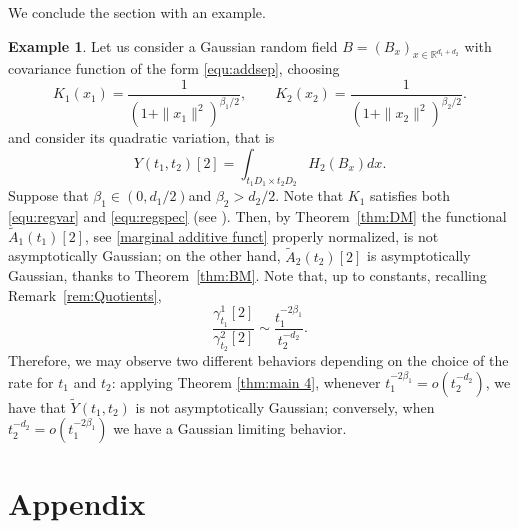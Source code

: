 \documentclass[12pt]{article}
\DeclareMathOperator{\1}{1}
\newcommand{\R}{\mathbb{R}}
\theoremstyle{plain}
\theoremstyle{definition}
\newtheorem{example}{Example}
\begin{document}
We conclude the section with an example.

\begin{example} \label{exa:slogt} 
Let us consider a Gaussian random field $B=(B_x)_{x\in\R^{d_1+d_2}}$ with covariance function of the form \eqref{equ:addsep}, 
choosing
\begin{equation}
    K_1(x_1)=\frac{1}{(1+\|x_1\|^2)^{\beta_1/2}}, \quad \quad K_2(x_2)=\frac{1}{(1+\|x_2\|^2)^{\beta_2/2}}.
\end{equation}
and consider its quadratic variation, that is \begin{equation}
    Y(t_1,t_2)[2]=\int_{t_1D_1\times t_2D_2}H_2(B_{x})dx.
\end{equation}
Suppose that $\beta_1\in (0,d_1/2)$and $\beta_2>d_2/2$. Note that $K_1$ satisfies both \eqref{equ:regvar} and \eqref{equ:regspec} (see \cite[Example 3]{LO13}). Then, by Theorem~\ref{thm:DM} the functional $\widetilde A_1(t_1)[2]$, see \eqref{marginal additive funct} properly normalized, is not asymptotically Gaussian; on the other hand, $\widetilde A_2(t_2)[2]$ is asymptotically Gaussian, thanks to Theorem~\ref{thm:BM}. Note that, up to constants, recalling Remark~\ref{rem:Quotients}, \begin{equation}
    \frac{\gamma^1_{t_1}[2]}{\gamma^2_{t_2}[2]} \sim  \frac{t_1^{-2\beta_1}}{t_2^{-d_2}}.
\end{equation}
Therefore, we may observe two different behaviors depending on the choice of the rate for $t_1$ and $t_2$: applying Theorem \ref{thm:main 4}, whenever $t_1^{-2\beta_1}=o( t_2^{-d_2})$, we have that $\widetilde{Y}(t_1,t_2)$ is not asymptotically Gaussian; conversely, when $ t_2^{-d_2}=o(t_1^{-2\beta_1})$ we have a Gaussian limiting behavior. 
\end{example}


\section*{Appendix}
\label{sec:appendix}
\end{document}

